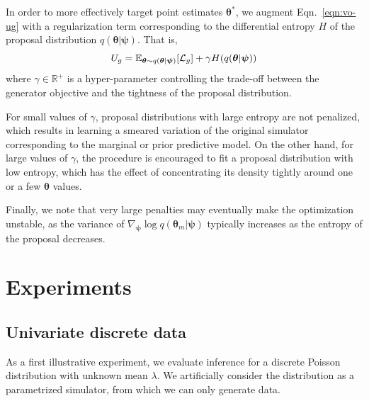 \documentclass[twocolumn,superscriptaddress,aps]{revtex4-1}
\newcommand{\kcnote}[1]{\textcolor{red}{[KC: #1]}}
\newcommand{\bftheta}{{\bm \theta}}
\newcommand{\bfpsi}{{\bm \psi}}
\theoremstyle{plain}
\begin{document}
In order to more effectively target
point estimates $\bftheta^*$, we augment Eqn.~\ref{eqn:vo-ug} with a
regularization term corresponding to the differential entropy $H$ of the
proposal distribution $q(\bftheta | \bfpsi)$. That is,
\begin{equation}
    U_g = \mathbb{E}_{\bftheta \sim q(\bftheta|\bfpsi)} [ {\cal L}_g ] + \gamma H(q(\bftheta|\bfpsi))
\end{equation}
where $\gamma \in \mathbb{R}^+$ is a hyper-parameter controlling the trade-off
between the generator objective and the tightness of the proposal distribution.

For small values of $\gamma$,
proposal distributions with large entropy are not penalized, which results
in learning a smeared variation of the original simulator corresponding to the marginal or prior predictive model. On the other hand,
for large values of $\gamma$, the procedure is encouraged to fit a proposal
distribution with low entropy, which has the effect of concentrating its density
tightly around one or a few $\bftheta$ values.

Finally, we note that very large penalties may
eventually make the optimization unstable, as the variance of $\nabla_\bfpsi \log q(\bftheta_m|\bfpsi)$
typically increases as the entropy of the proposal decreases.






\section{Experiments}

\subsection{Univariate discrete data}

As a first illustrative experiment, we evaluate inference for a discrete Poisson
distribution with unknown mean $\lambda$. We artificially consider
the distribution as a parametrized simulator, from which we can only
generate data.
\end{document}
